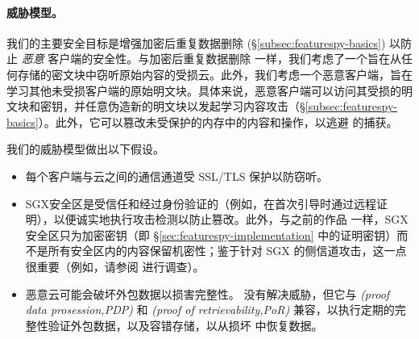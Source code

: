 \paragraph*{威胁模型。} 我们的主要安全目标是增强加密后重复数据删除 (\S\ref{subsec:featurespy-basics}) 以防止 {\em 恶意} 客户端的安全性。与加密后重复数据删除 \cite{bellare2013MLE} 一样，我们考虑了一个旨在从任何存储的密文块中窃听原始内容的受损云。此外，我们考虑一个恶意客户端，旨在学习其他未受损客户端的原始明文块。具体来说，恶意客户端可以访问其受损的明文块和密钥，并任意伪造新的明文块以发起学习内容攻击（\S\ref{subsec:featurespy-basics}）。此外，它可以篡改未受保护的内存中的内容和操作，以逃避 \sysnameF 的捕获。

我们的威胁模型做出以下假设。
\begin{itemize}[leftmargin=*]
\item
  每个客户端与云之间的通信通道受 SSL/TLS 保护以防窃听。
\item
  SGX安全区是受信任和经过身份验证的（例如，在首次引导时通过远程证明），以便诚实地执行攻击检测以防止篡改。此外，与之前的作品 \cite{shinde20, ren21} 一样，SGX安全区只为加密密钥（即 \S\ref{sec:featurespy-implementation} 中的证明密钥）而不是所有安全区内的内容保留机密性；鉴于针对 SGX 的侧信道攻击，这一点很重要（例如，请参阅 \cite{fei21} 进行调查）。
\item
  恶意云可能会破坏外包数据以损害完整性。 \sysnameF 没有解决威胁，但它与 \textit{  (proof data prosession,PDP)} \cite{ateniese07} 和 \textit{  (proof of retrievability,PoR)} \cite{juels07} 兼容，以执行定期的完整性验证外包数据，以及容错存储，以从损坏 \cite{li15} 中恢复数据。
\end{itemize}